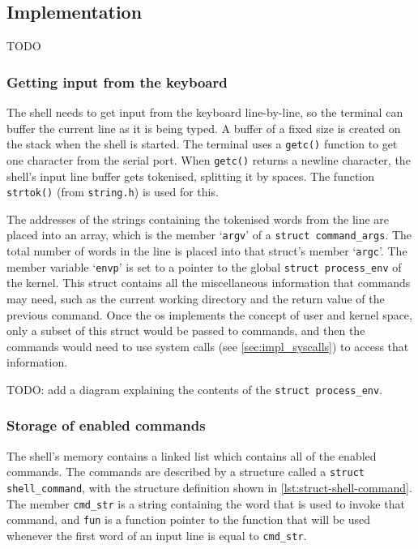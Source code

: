 \documentclass{article}
\begin{document}
\subsection{Implementation}
TODO

\subsubsection{Getting input from the keyboard}
The shell needs to get input from the keyboard line-by-line, so the terminal
can buffer the current line as it is being typed. A buffer of a fixed size is
created on the stack when the shell is started. The terminal uses a
\texttt{getc()} function to get one character from the serial port. When
\texttt{getc()} returns a newline character, the shell's input line buffer gets
tokenised, splitting it by spaces. The function \texttt{strtok()} (from
\texttt{string.h}) is used for this.

The addresses of the strings containing the tokenised words from the line are
placed into an array, which is the member `\texttt{argv}' of a \texttt{struct
command\_args}. The total number of words in the line is placed into that
struct's member `\texttt{argc}'. The member variable `\texttt{envp}' is set to
a pointer to the global \texttt{struct process\_env} of the kernel. This struct
contains all the miscellaneous information that commands may need, such as the
current working directory and the return value of the previous command. Once
the \gls{os} implements the concept of user and kernel space, only a subset of
this struct would be passed to commands, and then the commands would need to
use system calls (see \autoref{sec:impl_syscalls}) to access that information.

TODO: add a diagram explaining the contents of the \texttt{struct
process\_env}.

\subsubsection{Storage of enabled commands}
The shell's memory contains a linked list which contains all of the enabled
commands. The commands are described by a structure called a \texttt{struct
shell\_command}, with the structure definition shown in
\autoref{lst:struct-shell-command}. The member \verb!cmd_str! is a string
containing the word that is used to invoke that command, and \verb!fun! is a
function pointer to the function that will be used whenever the first word of
an input line is equal to \verb!cmd_str!.
\end{document}
